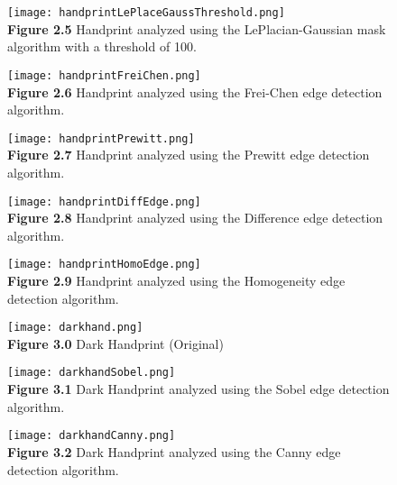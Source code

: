 \documentclass{article}%
\begin{document}
\newpage
\begin{figure}[h]
\centering
\texttt{[image: handprintLePlaceGaussThreshold.png]}\\
{\bf Figure 2.5} Handprint analyzed using the LePlacian-Gaussian mask algorithm with a threshold of 100.  
\end{figure}

\newpage
\begin{figure}[h]
\centering
\texttt{[image: handprintFreiChen.png]}\\
{\bf Figure 2.6} Handprint analyzed using the Frei-Chen edge detection algorithm.  
\end{figure}


\newpage
\begin{figure}[h]
\centering
\texttt{[image: handprintPrewitt.png]}\\
{\bf Figure 2.7} Handprint analyzed using the Prewitt edge detection algorithm.  
\end{figure}

\newpage
\begin{figure}[h]
\centering
\texttt{[image: handprintDiffEdge.png]}\\
{\bf Figure 2.8} Handprint analyzed using the Difference edge detection algorithm.  
\end{figure}

\newpage
\begin{figure}[h]
\centering
\texttt{[image: handprintHomoEdge.png]}\\
{\bf Figure 2.9} Handprint analyzed using the Homogeneity edge detection algorithm.  
\end{figure}  

\clearpage

\newpage
\begin{figure}[h]
\centering
\texttt{[image: darkhand.png]}\\
{\bf Figure 3.0} Dark Handprint (Original)
\end{figure}

\newpage
\begin{figure}[h]
\centering
\texttt{[image: darkhandSobel.png]}\\
{\bf Figure 3.1} Dark Handprint analyzed using the Sobel edge detection algorithm. 
\end{figure}  

  

\newpage
\begin{figure}[h]
\centering
\texttt{[image: darkhandCanny.png]}\\
{\bf Figure 3.2} Dark Handprint analyzed using the Canny edge detection algorithm.   
\end{figure}
\end{document}
